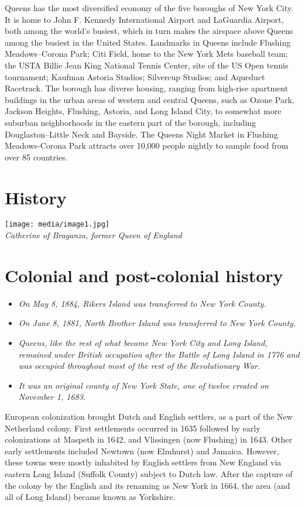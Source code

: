 Queens has the most diversified economy of the five boroughs of New York
City. It is home to John F. Kennedy International Airport and LaGuardia
Airport, both among the world's busiest, which in turn makes the
airspace above Queens among the busiest in the United States. Landmarks
in Queens include Flushing Meadows--Corona Park; Citi Field, home to the
New York Mets baseball team; the USTA Billie Jean King National Tennis
Center, site of the US Open tennis tournament; Kaufman Astoria Studios;
Silvercup Studios; and Aqueduct Racetrack. The borough has diverse
housing, ranging from high-rise apartment buildings in the urban areas
of western and central Queens, such as Ozone Park, Jackson Heights,
Flushing, Astoria, and Long Island City, to somewhat more suburban
neighborhoods in the eastern part of the borough, including
Douglaston--Little Neck and Bayside. The Queens Night Market in Flushing
Meadows-Corona Park attracts over 10,000 people nightly to sample food
from over 85 countries.

\section{History}\label{history}

\texttt{[image: media/image1.jpg]}\\
\emph{Catherine of Braganza, former Queen of England}

\section{Colonial and post-colonial
history}\label{colonial-and-post-colonial-history}

\begin{itemize}
\item
  \emph{On May 8, 1884, Rikers Island was transferred to New York
  County.}
\item
  \emph{On June 8, 1881, North Brother Island was transferred to New
  York County.}
\item
  \emph{Queens, like the rest of what became New York City and Long
  Island, remained under British occupation after the Battle of Long
  Island in 1776 and was occupied throughout most of the rest of the
  Revolutionary War.}
\item
  \emph{It was an original county of New York State, one of twelve
  created on November 1, 1683.}
\end{itemize}

European colonization brought Dutch and English settlers, as a part of
the New Netherland colony. First settlements occurred in 1635 followed
by early colonizations at Maspeth in 1642, and Vlissingen (now Flushing)
in 1643. Other early settlements included Newtown (now Elmhurst) and
Jamaica. However, these towns were mostly inhabited by English settlers
from New England via eastern Long Island (Suffolk County) subject to
Dutch law. After the capture of the colony by the English and its
renaming as New York in 1664, the area (and all of Long Island) became
known as Yorkshire.

